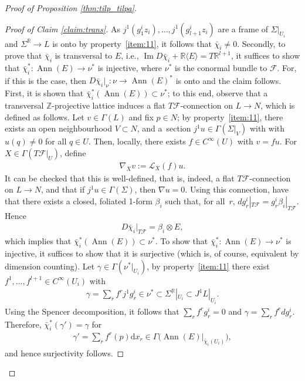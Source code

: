 \documentclass[10pt,a4paper]{amsart}
\numberwithin{equation}{section}
\DeclareMathOperator{\Ann}{Ann}
\renewcommand{\Im}{\operatorname{Im}} %
\newcommand{\de}{\mathrm{d}} %
\newcommand{\RR}{\mathbb{R}}
\newcommand{\ZZ}{\mathbb{Z}}
\begin{document}
\begin{proof}[Proof of Proposition \ref{thm:tilp_tilpa}]
\begin{proof}[Proof of Claim \ref{claim:trans}] As $j^1(g^i_1z_i),\ldots,j^1(g^i_{l+1}z_i)$ are a frame of $\Sigma|_{U_i}$ and $\Sigma^{\RR}\to L$ is onto by property~\ref{item:11}, it follows that $\bar\chi_i \neq 0$. Secondly, to prove that $\bar\chi_i$ is transversal to $E$, i.e., $\Im D\bar\chi_i + \RR \langle E \rangle=T\RR^{l+1}$, it suf\/f\/ices to show that $\bar\chi_i^*\colon \Ann(E)\to \nu^*$ is injective, where $\nu^*$ is the conormal bundle to $\mathcal{F}$. For, if this is the case, then $D\bar{\chi}_i|_{\nu} \colon \nu \to \Ann(E)^*$ is onto and the claim follows. First, it is shown that $\bar{\chi}^*_i(\Ann(E)) \subset \nu^*$; to this end, observe that a transversal $\ZZ$-projective lattice induces a f\/lat $T\mathcal{F}$-connection on $L \to N$, which is def\/ined as follows. Let $v \in \Gamma(L)$ and f\/ix $p \in N$; by property~\ref{item:11}, there exists an open neighbourhood $V \subset N$, and a~section $j^1u \in \Gamma(\Sigma|_V)$ with with $u(q) \neq 0$ for all $q \in U$. Then, locally, there exists $f \in C^{\infty}(U)$ with $v =f u$. For $X \in \Gamma(T\mathcal{F}|_U)$, def\/ine
 \begin{gather*}
 \nabla_X v := \mathcal{L}_X(f) u.
 \end{gather*}
It can be checked that this is well-def\/ined, that is, indeed, a f\/lat $T\mathcal{F}$-connection on $L \to N$, and that if $j^1u \in \Gamma(\Sigma)$, then $\nabla u =0$. Using this connection, have that there exists a closed, foliated 1-form $\beta_i$ such that, for all~$r$, $dg^i_r|_{T\mathcal{F}}=g^i_r\beta_i|_{T\mathcal{F}}$. Hence
 \begin{gather}\label{eq:euler}
 D\bar\chi_i|_{T\mathcal{F}}=\beta_i \otimes E,
 \end{gather}
which implies that $\bar\chi_i^*(\Ann(E))\subset \nu^*$. To show that $\bar\chi_i^*\colon \Ann(E)\to \nu^*$ is injective, it suf\/f\/ices to show that it is surjective (which is, of course, equivalent by dimension counting). Let $\gamma \in \Gamma(\nu^*|_{U_i})$, by property~\ref{item:11} there exist
 $f^1,\ldots,f^{l+1}\in C^\infty(U_i)$ with
 \begin{gather*}
 \gamma=\sum_rf^rj^1g^i_r\in \nu^*\subset \Sigma^\RR|_{U_i}\subset J^1L|_{U_i}.
 \end{gather*}
Using the Spencer decomposition, it follows that $\sum_rf^rg^i_r=0$ and $\gamma=\sum_rf^rdg^i_r$. Therefore, $\bar\chi_i^*(\gamma')=\gamma$ for
 \begin{gather*}
 \gamma'=\sum\limits_rf^r(p)\de x_r\in \Gamma\big(\Ann(E)|_{\bar\chi_i(U_i)}\big),
 \end{gather*}
 and hence surjectivity follows.
 \end{proof}


\end{proof}
\end{document}
